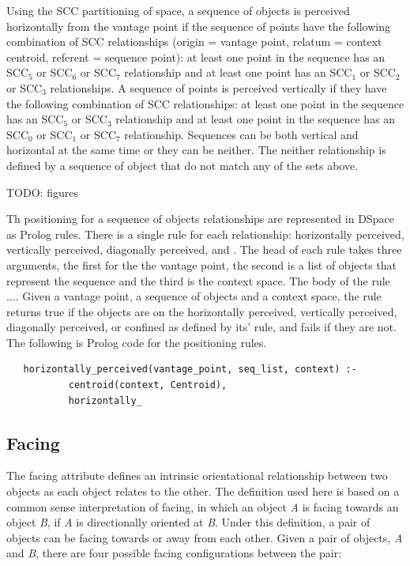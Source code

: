 \documentclass[12pt]{ucthesis}
\begin{document}
Using the SCC partitioning of space, a sequence of objects is perceived horizontally from the vantage point if the sequence of points have the following combination of SCC relationships (origin = vantage point, relatum = context centroid, referent = sequence point): at least one point in the sequence has an SCC$_{5}$ or SCC$_{6}$ or SCC$_{7}$ relationship and at least one point has an SCC$_{1}$ or SCC$_{2}$ or SCC$_{3}$ relationships. A sequence of points is perceived vertically if they have the following combination of SCC relationships: at least one point in the sequence has an SCC$_{5}$ or SCC$_{3}$ relationship and at least one point in the sequence has an SCC$_{0}$ or SCC$_{1}$ or SCC$_{7}$ relationship. Sequences can be both vertical and horizontal at the same time or they can be neither. The neither relationship is defined by a sequence of object that do not match any of the sets above.

TODO: figures

Th positioning for a sequence of objects relationships are represented in DSpace as Prolog rules. There is a single rule for each relationship: horizontally perceived, vertically perceived, diagonally perceived, and . The head of each rule takes three arguments, the first for the the vantage point, the second is a list of objects that represent the sequence and the third is the context space. The body of the rule .... Given a vantage point, a sequence of objects and a context space, the rule returns true if the objects are on the horizontally perceived, vertically perceived, diagonally perceived, or confined as defined by its' rule, and fails if they are not. The following is Prolog code for the positioning rules.
\begin{verbatim}
   horizontally_perceived(vantage_point, seq_list, context) :-
           centroid(context, Centroid),
           horizontally_
\end{verbatim}


\subsection{Facing}
The facing attribute defines an intrinsic orientational relationship between two objects as each object relates to the other. The definition used here is based on a common sense interpretation of facing, in which an object \emph{A} is facing towards an object \emph{B}, if \emph{A} is directionally oriented at \emph{B}. Under this definition, a pair of objects can be facing towards or away from each other. Given a pair of objects, \emph{A} and \emph{B}, there are four possible facing configurations between the pair: 
\end{document}
